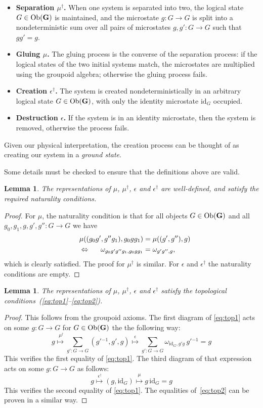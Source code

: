 \documentclass[a4paper,12pt]{article}
\newtheorem{lemma}[theorem]{Lemma}
\theoremstyle{definition}
\newcommand\cat[1]{{\ensuremath{\bf #1}}}
\renewcommand{\-}[0]{\nobreakdash-\hspace{0pt}}
\newcommand\Ob{\ensuremath{\mathrm{Ob}}}
\newcommand\id{\ensuremath{\mathrm{id}}}
\newcommand{\sdag}{{\ensuremath{\scriptscriptstyle{\dag}}}}
\begin{document}
\begin{itemize}
\item
{\bf Separation $\mu ^\dag$.} When one system is separated into two, the logical state $G \in \Ob(\cat G)$ is maintained, and the microstate $g: G \to G$ is split into a nondeterministic sum over all pairs of microstates $g,g': G \to G$ such that $gg' = g$.
\item {\bf Gluing $\mu$.}
The gluing process is the converse of the separation process: if the logical states of the two initial systems match, the microstates are multiplied using the groupoid algebra; otherwise the gluing process fails.
\item {\bf Creation $\epsilon ^\dag$.}
The system is created nondeterministically in an arbitrary  logical state $G \in \Ob(\cat G)$, with only the identity microstate $\id _G$ occupied.
\item {\bf Destruction $\epsilon$.} If the system is in an identity microstate, then the system is removed, otherwise the process fails.
\end{itemize}
Given our physical interpretation, the creation process can be thought of as creating our system in a \textit{ground state}.

Some details must be checked to ensure that the definitions above are valid.
\begin{lemma}
The representations of $\mu$, $\mu ^\dag$, $\epsilon$ and $\epsilon ^\dag$ are well-defined, and satisfy the required naturality conditions.
\end{lemma}
\begin{proof}
For $\mu$, the naturality condition is that for all objects $G \in \Ob ( \cat G )$ and all $g_0, g_1,g, g', g'' : G \to G$ we have
\begin{align*}
&& \mu ((g_0 g' , g'' g_1), g_0g g_1) &= \mu ((g', g''), g )
\\
\Leftrightarrow \hspace{-0.8cm}
&& \omega _{g_0 g' g'' g_1, g_0 g g_1} & = \omega _{g'g'', g},
\end{align*}
which is clearly satisfied. The proof for $\mu ^\dag$ is similar. For $\epsilon$ and $\epsilon ^\dag$ the naturality conditions are empty.
\end{proof}
\begin{lemma}
The representations of $\mu$, $\mu ^\sdag$, $\epsilon$ and $\epsilon ^\dag$ satisfy the topological conditions~(\ref{eq:top1}--\ref{eq:top2}).
\end{lemma}
\begin{proof}
This follows from the groupoid axioms. The first diagram of \eqref{eq:top1} acts on some $g:G \to G$ for $G \in \Ob(\cat G)$ the the following way:
$$\textstyle g \stackrel {\,\,\mu ^\dag} \mapsto \sum _{g':G \to G} (g' {}^{-1},g', g) \stackrel \epsilon \mapsto \sum _{g':G \to G} \omega _{\id_G, g'g} \, g' {}^{-1} = g$$
This verifies the first equality of \eqref{eq:top1}. The third diagram of that expression acts on some $g:G \to G$ as follows:
$$g \stackrel {\,\epsilon ^\dag} \mapsto (g, \id_G) \stackrel \mu \mapsto g \, \id_G = g$$
This verifies the second
equality of \eqref{eq:top1}. The equalities of~\eqref{eq:top2} can be proven in a similar way.
\end{proof}
\end{document}
